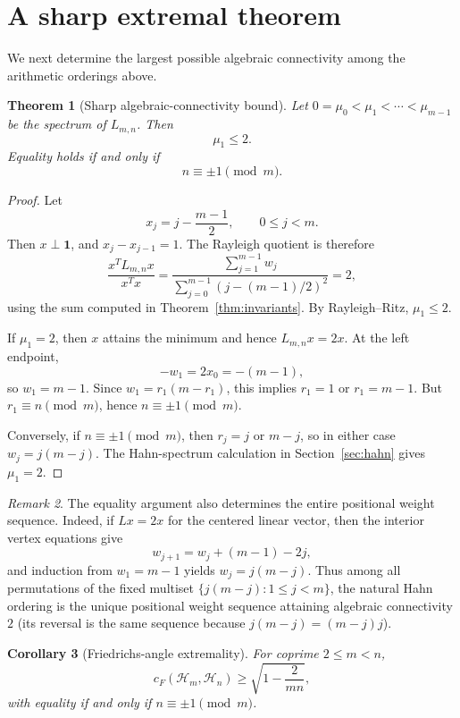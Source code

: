 \documentclass[11pt]{article}
\newtheorem{theorem}{Theorem}[section]
\newtheorem{corollary}[theorem]{Corollary}
\theoremstyle{remark}
\newtheorem{remark}[theorem]{Remark}
\newcommand{\cF}{c_F}
\newcommand{\1}{\mathbf 1}
\begin{document}
\section{A sharp extremal theorem}
We next determine the largest possible algebraic connectivity among the
arithmetic orderings above.

\begin{theorem}[Sharp algebraic-connectivity bound]\label{thm:extremal}
Let $0=\mu_0<\mu_1<\cdots<\mu_{m-1}$ be the spectrum of $L_{m,n}$. Then
\[
\mu_1\le2.
\]
Equality holds if and only if
\[
n\equiv\pm1\pmod m.
\]
\end{theorem}

\begin{proof}
Let
\[
x_j=j-\frac{m-1}{2},\qquad 0\le j<m.
\]
Then $x\perp\1$, and $x_j-x_{j-1}=1$. The Rayleigh quotient is therefore
\[
\frac{x^TL_{m,n}x}{x^Tx}
=\frac{\sum_{j=1}^{m-1}w_j}
{\sum_{j=0}^{m-1}(j-(m-1)/2)^2}=2,
\]
using the sum computed in Theorem~\ref{thm:invariants}. By Rayleigh--Ritz,
$\mu_1\le2$.

If $\mu_1=2$, then $x$ attains the minimum and hence
$L_{m,n}x=2x$. At the left endpoint,
\[
-w_1=2x_0=-(m-1),
\]
so $w_1=m-1$. Since $w_1=r_1(m-r_1)$, this implies
$r_1=1$ or $r_1=m-1$. But $r_1\equiv n\pmod m$, hence
$n\equiv\pm1\pmod m$.

Conversely, if $n\equiv\pm1\pmod m$, then
$r_j=j$ or $m-j$, so in either case $w_j=j(m-j)$. The Hahn-spectrum
calculation in Section~\ref{sec:hahn} gives $\mu_1=2$.
\end{proof}

\begin{remark}
The equality argument also determines the entire positional weight sequence.
Indeed, if $Lx=2x$ for the centered linear vector, then the interior vertex
equations give
\[
w_{j+1}=w_j+(m-1)-2j,
\]
and induction from $w_1=m-1$ yields $w_j=j(m-j)$.
Thus among all permutations of the fixed multiset
$\{j(m-j):1\le j<m\}$, the natural Hahn ordering is the unique positional
weight sequence attaining algebraic connectivity $2$ (its reversal is the
same sequence because $j(m-j)=(m-j)j$).
\end{remark}

\begin{corollary}[Friedrichs-angle extremality]\label{cor:friedrichs}
For coprime $2\le m<n$,
\[
\cF(\mathcal H_m,\mathcal H_n)
\ge \sqrt{1-\frac{2}{mn}},
\]
with equality if and only if $n\equiv\pm1\pmod m$.
\end{corollary}
\end{document}
